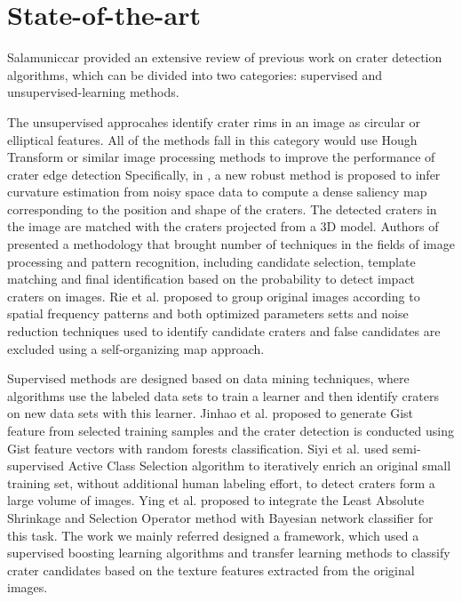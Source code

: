 \documentclass[conference]{IEEEtran}
\begin{document}
\section{State-of-the-art}

Salamuniccar\cite{salamuniccar2008open} provided an extensive review of previous work on crater detection algorithms, which can be divided into two categories: supervised and unsupervised-learning methods. 

The unsupervised approcahes identify crater rims in an image as circular or elliptical features\cite{bandeira2007impact,cheng2003optical,honda2002mining,leroy2001crater,galloway2014image}. All of the methods fall in this category would use Hough Transform or similar image processing methods to improve the performance of crater edge detection Specifically, in \cite{leroy2001crater}, a new robust method is proposed to infer curvature estimation from noisy space data  to compute a dense saliency map corresponding to the position and shape of the craters. The detected craters in the image are matched with the craters projected from a 3D model. Authors of \cite{bandeira2007impact} presented a methodology that brought number of techniques in the fields of image processing and pattern recognition, including candidate selection, template matching and final identification based on the probability to detect impact craters on images. Rie et al.\cite{honda2002mining} proposed to group original images according to spatial frequency patterns and both optimized parameters setts and noise reduction techniques used to identify candidate craters and false candidates are excluded using a self-organizing map approach.

Supervised methods are designed based on data mining techniques, where algorithms use the labeled data sets to train a learner and then identify craters on new data sets with this learner. Jinhao et al. \cite{Jihao2015selected} proposed to generate Gist feature from selected training samples and the crater detection is conducted using Gist feature vectors with random forests classification. Siyi et al.\cite{siyi2011image} used semi-supervised Active Class Selection algorithm to iteratively enrich an original small training set, without additional human labeling effort, to detect craters form a large volume of images. Ying et al. \cite{ying2013crater} proposed to integrate the Least Absolute Shrinkage and Selection Operator method  with Bayesian network classifier for this task. The work we mainly referred designed a framework, which used a supervised boosting learning algorithms and transfer learning methods to classify crater candidates based on the texture features extracted from the original images.
\end{document}
